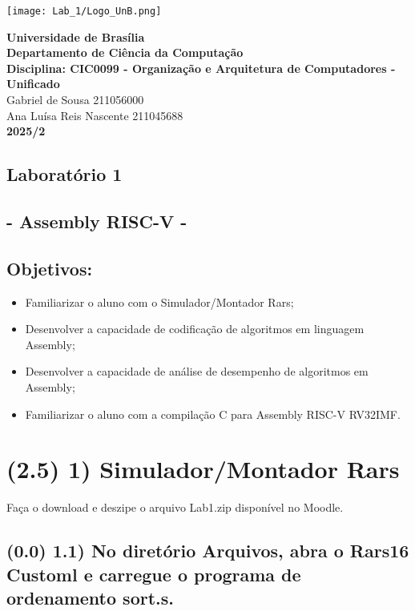 \documentclass{article}
\begin{document}
\begin{center}
    \texttt{[image: Lab\_1/Logo\_UnB.png]}
    
    \textbf{Universidade de Brasília} \\
    \textbf{Departamento de Ciência da Computação} \\
    \textbf{Disciplina: CIC0099 - Organização e Arquitetura de Computadores - Unificado} \\
    
    Gabriel de Sousa 211056000 \\
    Ana Luísa Reis Nascente 211045688\\
    \textbf{2025/2}
\end{center}

\vspace{1cm}

\begin{center}
    \section*{Laboratório 1}
    \subsection*{- Assembly RISC-V -}
\end{center}

\subsection*{Objetivos:}
\begin{itemize}
    \item Familiarizar o aluno com o Simulador/Montador Rars;
    \item Desenvolver a capacidade de codificação de algoritmos em linguagem Assembly;
    \item Desenvolver a capacidade de análise de desempenho de algoritmos em Assembly;
    \item Familiarizar o aluno com a compilação C para Assembly RISC-V RV32IMF.
\end{itemize}

\section*{(2.5) 1) Simulador/Montador Rars}
Faça o download e deszipe o arquivo Lab1.zip disponível no Moodle.

\subsection*{(0.0) 1.1) No diretório Arquivos, abra o Rars16 Customl e carregue o programa de ordenamento sort.s.}
\end{document}
